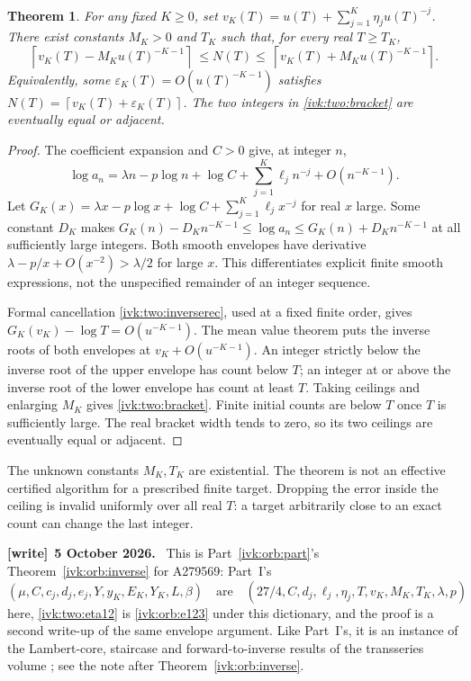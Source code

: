 \documentclass[11pt,letterpaper]{article}
\newtheorem{theorem}{Theorem}[section]
\theoremstyle{remark}\newtheorem{remark}[theorem]{Remark}
\newcommand{\eps}{\varepsilon}
\newcommand{\ceil}[1]{\left\lceil#1\right\rceil}
\newenvironment{writenote}[1][]{\par\smallskip\begingroup\small
 \noindent\textbf{[write]}\if\relax\detokenize{#1}\relax\else~\textbf{#1.}\fi\ }%
 {\par\endgroup\smallskip}
\begin{document}
\begin{theorem}\label{ivk:two:inverse}
For any fixed $K\ge0$, set
$v_K(T)=u(T)+\sum_{j=1}^K\eta_ju(T)^{-j}$. There exist constants
$M_K>0$ and $T_K$ such that, for every real $T\ge T_K$,
\begin{equation}\label{ivk:two:bracket}
 \ceil{v_K(T)-M_Ku(T)^{-K-1}}
 \ \le N(T)\le\
 \ceil{v_K(T)+M_Ku(T)^{-K-1}}.
\end{equation}
Equivalently, some $\eps_K(T)=O(u(T)^{-K-1})$ satisfies
$N(T)=\ceil{v_K(T)+\eps_K(T)}$. The two integers in
\eqref{ivk:two:bracket} are eventually equal or adjacent.
\end{theorem}
\begin{proof}
The coefficient expansion and $C>0$ give, at integer $n$,
\[
 \log a_n=\lambda n-p\log n+\log C
          +\sum_{j=1}^K\ell_jn^{-j}+O(n^{-K-1}).
\]
Let $G_K(x)=\lambda x-p\log x+\log C+
\sum_{j=1}^K\ell_jx^{-j}$ for real $x$ large. Some constant $D_K$
makes $G_K(n)-D_Kn^{-K-1}\le\log a_n\le
G_K(n)+D_Kn^{-K-1}$ at all sufficiently large integers. Both smooth
envelopes have derivative $\lambda-p/x+O(x^{-2})>\lambda/2$ for
large $x$. This differentiates explicit finite smooth expressions,
not the unspecified remainder of an integer sequence.

Formal cancellation \eqref{ivk:two:inverserec}, used at a fixed finite order,
gives $G_K(v_K)-\log T=O(u^{-K-1})$. The mean value theorem puts
the inverse roots of both envelopes at $v_K+O(u^{-K-1})$. An integer
strictly below the inverse root of the upper envelope has count
below $T$; an integer at or above the inverse root of the lower
envelope has count at least $T$. Taking ceilings and enlarging
$M_K$ gives \eqref{ivk:two:bracket}. Finite initial counts are below $T$
once $T$ is sufficiently large. The real bracket width tends to
zero, so its two ceilings are eventually equal or adjacent.
\end{proof}
The unknown constants $M_K,T_K$ are existential. The theorem is not
an effective certified algorithm for a prescribed finite target.
Dropping the error inside the ceiling is invalid uniformly over all
real $T$: a target arbitrarily close to an exact count can change
the last integer.
\begin{writenote}[5 October 2026]
This is Part~\ref{ivk:orb:part}'s Theorem~\ref{ivk:orb:inverse} for A279569: Part~I's
\[(\mu,C,c_j,d_j,e_j,Y,y_K,E_K,Y_K,L,\beta)\quad\text{are}\quad(27/4,C,d_j,\ell_j,\eta_j,T,v_K,M_K,T_K,\lambda,p)\]
here, \eqref{ivk:two:eta12} is \eqref{ivk:orb:e123} under this dictionary, and the proof is a second write-up of the same envelope argument. Like Part~I's, it is an instance of the Lambert-core, staircase and forward-to-inverse results of the transseries volume \cite{tsvol}; see the note after Theorem~\ref{ivk:orb:inverse}.
\end{writenote}
\end{document}
